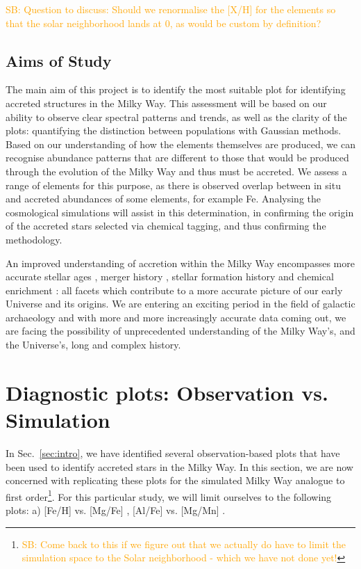 \documentclass[fleqn,usenatbib]{mnras}
\newcommand{\SB}[1]{{\textcolor{orange}{SB: #1}}}
\begin{document}
\SB{Question to discuss: Should we renormalise the [X/H] for the elements so that the solar neighborhood lands at 0, as would be custom by definition?}

\subsection{Aims of Study} 

The main aim of this project is to identify the most suitable plot for identifying accreted structures in the Milky Way. This assessment will be based on our ability to observe clear spectral patterns and trends, as well as the clarity of the plots: quantifying the distinction between populations with Gaussian methods. Based on our understanding of how the elements themselves are produced, we can recognise abundance patterns that are different to those that would be produced through the evolution of the Milky Way and thus must be accreted. We assess a range of elements for this purpose, as there is observed overlap between in situ and accreted abundances of some elements, for example Fe.  Analysing the cosmological simulations will assist in this determination, in confirming the origin of the accreted stars selected via chemical tagging, and thus confirming the methodology.

An improved understanding of accretion within the Milky Way encompasses more accurate stellar ages \citep{Das2020}, merger history \citep{Naidu2020}, stellar formation history and chemical enrichment \citep{DeSilva2015}: all facets which contribute to a more accurate picture of our early Universe and its origins. We are entering an exciting period in the field of galactic archaeology and with more and more increasingly accurate data coming out, we are facing the possibility of unprecedented understanding of the Milky Way’s, and the Universe’s, long and complex history.


\section{Diagnostic plots: Observation vs. Simulation}
\label{sec:comparison}

In Sec.~\ref{sec:intro}, we have identified several observation-based plots that have been used to identify accreted stars in the Milky Way. In this section, we are now concerned with replicating these plots for the simulated Milky Way analogue to first order\footnote{\SB{Come back to this if we figure out that we actually do have to limit the simulation space to the Solar neighborhood - which we have not done yet!}}. For this particular study, we will limit ourselves to the following plots: a) [Fe/H] vs. [Mg/Fe] \citep{Nissen2010}, [Al/Fe] vs. [Mg/Mn] \citep{Hawkins2015, Das2020}.
\end{document}
